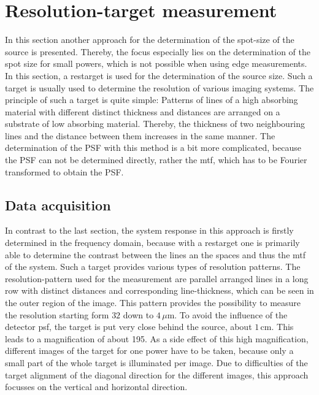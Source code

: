 \section[R-target measurement]{Resolution-target measurement}\label{sec:targetmeasurements}
In this section another approach for the determination of the spot-size of the source is presented. Thereby, the focus especially lies on the determination of the spot size for small powers, which is not possible when using edge measurements. In this section, a \gls{restarget} is used for the determination of the source size. Such a target is usually used to determine the resolution of various imaging systems. The principle of such a target is quite simple: Patterns of lines of a high absorbing material with different distinct thickness and distances are arranged on a substrate of low absorbing material. Thereby, the thickness of two neighbouring lines and the distance between them increases in the same manner. The determination of the PSF with this method is a bit more complicated, because the PSF can not be determined directly, rather the \gls{mtf}, which has to be Fourier transformed to obtain the PSF.
\subsection{Data acquisition}\label{subsec:targetdata}
In contrast to the last section, the system response in this approach is firstly determined in the frequency domain, because with a \gls{restarget} one is primarily able to determine the contrast between the lines an the spaces and thus the \gls{mtf} of the system. 
Such a target provides various types of resolution patterns. The resolution-pattern used for the measurement are parallel arranged lines in a long row with distinct distances and corresponding line-thickness, which can be seen in the outer region of the image. This pattern provides the possibility to measure the resolution starting form $32$ down to $4\, \mu$m. To avoid the influence of the detector \gls{psf}, the target is put very close behind the source, about $1\,$cm. This leads to a magnification of about 195. As a side effect of this high magnification, different images of the target for one power have to be taken, because only a small part of the whole target is illuminated per image. Due to difficulties of the target alignment of the diagonal direction for the different images, this approach focusses on the vertical and horizontal direction.\\

